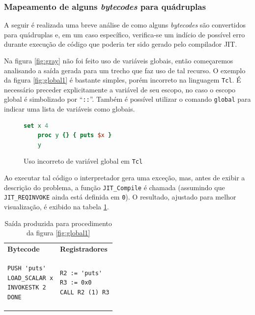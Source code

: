 \subsubsection{Mapeamento de alguns \textit{bytecodes} para quádruplas}

A seguir é realizada uma breve análise de como alguns
\textit{bytecodes} são convertidos para quádruplas e, em um caso
específico, verifica-se um indício de possível erro durante execução
de código que poderia ter sido gerado pelo compilador JIT.

Na figura \ref{fig:gray} não foi feito uso de variáveis globais, então
começaremos analisando a saída gerada para um trecho que faz uso de
tal recurso. O exemplo da figura \ref{fig:global1} é bastante simples,
porém incorreto na linguagem \texttt{Tcl}. É necessário preceder
explicitamente a variável de seu escopo, no caso o escopo global é
simbolizado por ``\verb!::!''. Também é possível utilizar o comando
\verb!global! para indicar uma lista de variáveis como globais.

\begin{figure}[h]
  \centering
  \begin{lstlisting}[language=Tcl]
    set x 4
    proc y {} { puts $x }
    y
  \end{lstlisting}
  \caption{Uso incorreto de variável global em
    \texttt{Tcl} \label{fig:global1}}
\label{xx$xx}
\end{figure}

Ao executar tal código o interpretador gera uma exceção, mas, antes de
exibir a descrição do problema, a função \verb!JIT_Compile! é
chamada (assumindo que \verb!JIT_REQINVOKE! ainda está definida em \verb!0!).
O resultado, ajustado para melhor visualização, é exibido na
tabela \ref{tabela1}.

\begin{table}[h]
  \centering
  \caption{Saída produzida para procedimento da figura \ref{fig:global1} \label{tabela1}}
  \begin{tabular}{| p{4cm} | p{4cm} |}
    \hline
    \bf{Bytecode} & \bf{Registradores} \\
\begin{verbatim}
PUSH 'puts'
LOAD_SCALAR x
INVOKESTK 2
DONE
\end{verbatim} &
\begin{verbatim}
R2 := 'puts'
R3 := 0x0
CALL R2 (1) R3
\end{verbatim} \\
    \hline
  \end{tabular}
\end{table}

